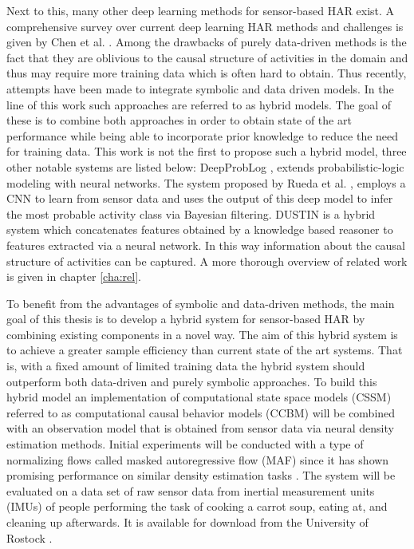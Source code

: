 \documentclass[11pt,titlepage,oneside,openany]{book}
\begin{document}
Next to this, many other deep learning methods for sensor-based HAR exist. A comprehensive survey over current deep learning HAR methods and challenges is given by Chen et al. \cite{chen_deep_2022}. Among the drawbacks of purely data-driven methods is the fact that they are oblivious to the causal structure of activities in the domain and thus may require more training data which is often hard to obtain. Thus recently, attempts have been made to integrate symbolic and data driven models. In the line of this work such approaches are referred to as hybrid models. The goal of these is to combine both approaches in order to obtain state of the art performance while being able to incorporate prior knowledge to reduce the need for training data. This work is not the first to propose such a hybrid model, three other notable systems are listed below: DeepProbLog \cite{manhaeve_deepproblog_2018}, extends probabilistic-logic modeling with neural networks. The system proposed by Rueda et al. \cite{rueda_combining_2019}, employs a CNN to learn from sensor data and uses the output of this deep model to infer the most probable activity class via Bayesian filtering. DUSTIN \cite{arrotta_knowledge_2022} is a hybrid system which concatenates features obtained by a knowledge based reasoner to features extracted via a neural network. In this way information about the causal structure of activities can be captured. A more thorough overview of related work is given in chapter \ref{cha:rel}.

To benefit from the advantages of symbolic and data-driven methods, the main goal of this thesis is to develop a hybrid system for sensor-based HAR by combining existing components in a novel way. The aim of this hybrid system is to achieve a greater sample efficiency than current state of the art systems. That is, with a fixed amount of limited training data the hybrid system should outperform both data-driven and purely symbolic approaches. To build this hybrid model an implementation of computational state space models (CSSM) \cite{kruger_computational_2014} referred to as computational causal behavior models (CCBM) will be combined with an observation model that is obtained from sensor data via neural density estimation methods. Initial experiments will be conducted with a type of normalizing flows called masked autoregressive flow (MAF) \cite{papamakarios_masked_2017} since it has shown promising performance on similar density estimation tasks \cite{kobyzev_normalizing_2021}. The system will be evaluated on a data set of raw sensor data from inertial measurement units (IMUs) of people performing the task of cooking a carrot soup, eating at, and cleaning up afterwards. It is available for download from the University of Rostock \cite{kruger2017recognising}. %
\end{document}
